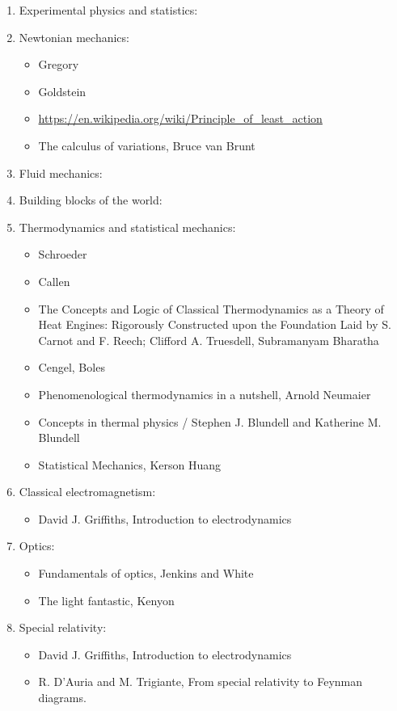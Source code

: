 \documentclass{report}
\begin{document}
\begin{enumerate}
\item Experimental physics and statistics:
\item Newtonian mechanics:
\begin{itemize}
\item Gregory
\item Goldstein
\item \url{https://en.wikipedia.org/wiki/Principle_of_least_action}
\item The calculus of variations, Bruce van Brunt
\end{itemize}
\item Fluid mechanics:
\item Building blocks of the world:
\item Thermodynamics and statistical mechanics:
\begin{itemize}
\item Schroeder
\item Callen
\item The Concepts and Logic of Classical Thermodynamics as a Theory of Heat Engines: Rigorously Constructed upon the Foundation Laid by S. Carnot and F. Reech; Clifford A. Truesdell, Subramanyam Bharatha 
\item Cengel, Boles
\item Phenomenological thermodynamics in a nutshell, Arnold Neumaier
\item Concepts in thermal physics / Stephen J. Blundell and Katherine M. Blundell
\item Statistical Mechanics, Kerson Huang
\end{itemize}
\item Classical electromagnetism:
\begin{itemize}
\item David J. Griffiths, Introduction to electrodynamics
\end{itemize}
\item Optics:
\begin{itemize}
\item Fundamentals of optics, Jenkins and White
\item The light fantastic, Kenyon
\end{itemize}
\item Special relativity:
\begin{itemize}
\item David J. Griffiths, Introduction to electrodynamics
\item R. D'Auria and M. Trigiante, From special relativity to Feynman diagrams.

\end{itemize}
\end{enumerate}
\end{document}
